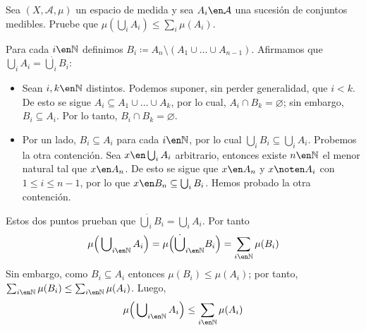 \setcounter{neje}{28}
\begin{nejer}[Repetido]
Sea $(X, \mathcal{A}, \mu)$ un espacio de medida y sea $A_i \en \mathcal{A}$ una sucesión de conjuntos medibles. Pruebe que $\mu(\bigcup_i A_i) \leq \sum_i \mu(A_i)$.
\end{nejer}
\begin{sol}
Para cada $i\en\mathbb{N}$ definimos $B_i \coloneq A_{n}\setminus(A_1\cup\dots\cup A_{n-1})$. Afirmamos que $\bigcup_iA_i= \dot\bigcup_iB_i$:
\begin{itemize}
\item Sean $i,k\en\mathbb{N}$ distintos. Podemos suponer, sin perder generalidad, que $i < k$. De esto se sigue $A_i \subseteq A_1 \cup \dots \cup A_k$, por lo cual, $A_i \cap B_k = \varnothing$; sin embargo, $B_i \subseteq A_i$. Por lo tanto, $B_i \cap B_k = \varnothing$.

\item Por un lado, $B_i \subseteq A_i$ para cada $i\en\mathbb{N}$, por lo cual $\bigcup_iB_i \subseteq \bigcup_iA_i$. Probemos la otra contención. Sea $x\en\bigcup_iA_i$ arbitrario, entonces existe $n\en\mathbb{N}$ el menor natural tal que $x\en A_n$. De esto se sigue que $x\en A_n$ y $x\noten A_i$ con $1 \leq i \leq n-1$, por lo que $x \en B_n \subseteq \bigcup_i B_i$. Hemos probado la otra contención.
\end{itemize}
Estos dos puntos prueban que $\dot\bigcup_iB_i = \bigcup_iA_i$. Por tanto
\[
\mu\Big(\bigcup\nolimits_{i\en\mathbb{N}}A_i\Big)%
= \mu\Big(\dot\bigcup_{i\en\mathbb{N}}B_i\Big)%
= \sum_{i\en\mathbb{N}} \mu(B_i)
\]
Sin embargo, como $B_i \subseteq A_i$ entonces $\mu(B_i) \leq \mu(A_i)$; por tanto, $\sum_{i\en\mathbb{N}}\mu(B_i) \leq \sum_{i\en\mathbb{N}}\mu(A_i)$. Luego,
\[
\mu\Big(\bigcup\nolimits_{i\en\mathbb{N}}A_i\Big)%
\leq%
\sum_{i\en\mathbb{N}}\mu(A_i)
\]
\end{sol}